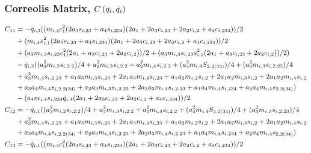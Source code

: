 	\subsubsection{Correolis Matrix, $C\left(q_{i},\dot{q}_{i}\right)$}
	\begin{equation*}\small
		\begin{split} 
		C_{11} 	& = -\dot{q}_{i,3} ((m_{i,4} c_{1}^2 (2 a_{3} s_{i,23} + a_{4} s_{i,234}) (2 a_{1} + 2 a_{3} c_{i,23} + 2 a_{2} c_{i,2} + a_{4} c_{i,234}))/2\\ 
				& + (m_{i,4} s_{i,1}^2 (2 a_{3} s_{i,23} + a_{4} s_{i,234}) (2 a_{1} + 2 a_{3} c_{i,23} + 2 a_{2} c_{i,2} + a_{4} c_{i,234}))/2 \\
				& + (a_{3} m_{i,3} s_{i,23} c_{1}^2 (2 a_{1} + a_{3} c_{i,23} + 2 a_{2} c_{i,2}))/2 + (a_{3} m_{i,3} s_{i,23} s_{i,1}^2 (2 a_{1} + a_{3} c_{i,23} + 2 a_{2} c_{i,2}))/2) \\
				& - \dot{q}_{i,2} ((a_{2}^2 m_{i,2} s_{i,2.2})/4 + a_{2}^2 m_{i,3} s_{i,2.2} + a_{2}^2 m_{i,4} s_{i,2.2} + (a_{4}^2 m_{i,4} S_{2.2(34)})/4 + (a_{3}^2 m_{i,3} s_{i,2.23})/4 \\
				& + a_{3}^2 m_{i,4} s_{i,2.23} + a_{1} a_{3} m_{i,3} s_{i,23} + 2 a_{1} a_{3} m_{i,4} s_{i,23} + a_{1} a_{2} m_{i,2} s_{i,2} + 2 a_{1} a_{2} m_{i,3} s_{i,2} + 2 a_{1} a_{2} m_{i,4} s_{i,2} \\
				& + a_{3} a_{4} m_{i,4} s_{i,2.2(34)} + a_{2} a_{3} m_{i,3} s_{i,2.23} + 2 a_{2} a_{3} m_{i,4} s_{i,2.23} + a_{1} a_{4} m_{i,4} s_{i,234} + a_{2} a_{4} m_{i,4} s_{2.2(34)}) \\
				& - (a_{4} m_{i,4} s_{i,234} \dot{q}_{i,4} (2 a_{1} + 2 a_{3} c_{i,23} + 2 a_{2} c_{i,2} + a_{4} c_{i,234}))/2\\
	 	C_{12} 	& = -\dot{q}_{i,1} ((a_{2}^2 m_{i,2} s_{i,2.2})/4 + a_{2}^2 m_{i,3} s_{i,2.2} + a_{2}^2 m_{i,4} s_{i,2.2} + (a_{4}^2 m_{i,4} S_{2.2(34)})/4 + (a_{3}^2 m_{i,3} s_{i,2.23})/4 \\
	 			& + a_{3}^2 m_{i,4} s_{i,2.23} + a_{1} a_{3} m_{i,3} s_{i,23} + 2 a_{1} a_{3} m_{i,4} s_{i,23} + a_{1} a_{2} m_{i,2} s_{i,2} + 2 a_{1} a_{2} m_{i,3} s_{i,2} + 2 a_{1} a_{2} m_{i,4} s_{i,2} \\
	 			& + a_{3} a_{4} m_{i,4} s_{i,2.2(34)} + a_{2} a_{3} m_{i,3} s_{i,2.23} + 2 a_{2} a_{3} m_{i,4} s_{i,2.23} + a_{1} a_{4} m_{i,4} s_{i,234} + a_{2} a_{4} m_{i,4} s_{2.2(34)})\\
	 	C_{13} 	& = -\dot{q}_{i,1} ((m_{i,4} c_{1}^2 (2 a_{3} s_{i,23} + a_{4} s_{i,234}) (2 a_{1} + 2 a_{3} c_{i,23} + 2 a_{2} c_{i,2} + a_{4} c_{i,234}))/2 \\

\end{split}
\end{equation*}
